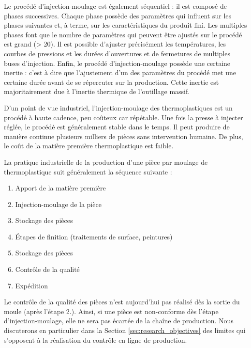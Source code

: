 Le procédé d'injection-moulage est également séquentiel : il est composé de phases successives.
Chaque phase possède des paramètres qui influent sur les phases suivantes et, à terme, sur les caractéristiques du produit fini.
Les multiples phases font que le nombre de paramètres qui peuvent être ajustés sur le procédé est grand (> 20).
Il est possible d’ajuster précisément les températures, les courbes de pressions et les durées d’ouvertures et de fermetures de multiples buses d’injection.
Enfin, le procédé d'injection-moulage possède une certaine inertie : c'est à dire que l'ajustement d'un des paramètres du procédé met une certaine durée avant de se répercuter sur la production.
Cette inertie est majoritairement due à l'inertie thermique de l'outillage massif.



D'un point de vue industriel, l’injection-moulage des thermoplastiques est un procédé à haute cadence, peu coûteux car répétable.
Une fois la presse à injecter réglée, le procédé est généralement stable dans le temps.
Il peut produire de manière continue plusieurs milliers de pièces sans intervention humaine.
De plus, le coût de la matière première thermoplastique est faible.

La pratique industrielle de la production d'une pièce par moulage de thermoplastique suit généralement la séquence suivante :
\begin{enumerate}
	\item Apport de la matière première
	\item Injection-moulage de la pièce
	\item Stockage des pièces
	\item Étapes de finition (traitements de surface, peintures) 
	\item Stockage des pièces
	\item Contrôle de la qualité
	\item Expédition
\end{enumerate}
Le contrôle de la qualité des pièces n'est aujourd'hui pas réalisé dès la sortie du moule (après l'étape 2.).
Ainsi, si une pièce est non-conforme dès l'étape d'injection-moulage, elle ne sera pas écartée de la chaîne de production.
Nous discuterons en particulier dans la Section \ref{sec:research_objectives} des limites qui s'opposent à la réalisation du contrôle en ligne de production.

